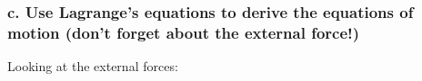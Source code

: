 \documentclass[12pt, letterpaper]{../assignment}
\begin{document}
\subsubsection*{c. Use Lagrange's equations to derive the equations of motion (don't forget about the external
force!)}

Looking at the external forces:





\end{document}
